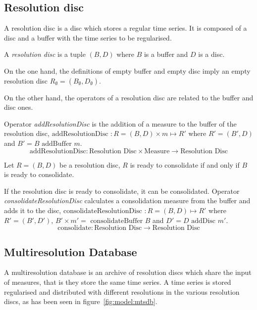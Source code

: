 \subsection{Resolution disc}

A resolution disc is a disc which stores a regular time series. It is
composed of a disc and a buffer with the time series to be
regularised.

\begin{definition}
  A \emph{resolution disc} is a tuple $(B,D)$ where $B$
  is a buffer and $D$ is a disc.
\end{definition}
 
On the one hand, the definitions of empty buffer and empty disc imply
an empty resolution disc $R_{\emptyset} = (B_{\emptyset},D_{\emptyset})$.

On the other hand, the operators of a resolution disc are related to
the buffer and disc ones.

Operator \emph{addResolutionDisc} is the addition of a measure to the
buffer of the resolution disc, $\text{addResolutionDisc } : R=(B,D) \times m \mapsto R'$ where
$R'= (B',D)$ and $B'= B \text{ addBuffer } m$.
\[
\text{addResolutionDisc}: \text{Resolution Disc} \times \text{Measure}
\longrightarrow \text{Resolution Disc}
\]

Let $R=(B,D)$ be a resolution disc, $R$ is ready to consolidate if and
only if $B$ is ready to consolidate.

If the resolution disc is ready to consolidate, it can be
consolidated.  Operator \emph{consolidateResolutionDisc} calculates a
consolidation measure from the buffer and adds it to the disc,
$\text{consolidateResolutionDisc } : R=(B,D) \mapsto R'$ where $R'=
(B',D')$, $B' \times m'= \text{ consolidateBuffer } B $ and $ D'= D
\text{ addDisc } m'$.
\[
\text{consolidate}: \text{Resolution Disc} \longrightarrow
\text{Resolution Disc}
\]




\subsection{Multiresolution Database}\label{sec:model:rrd}

A multiresolution database is an archive of resolution discs which
share the input of measures, that is they store the same time
series. A time series is stored regularised and distributed with
different resolutions in the various resolution discs, as has been seen
in figure~\ref{fig:model:mtsdb}.

